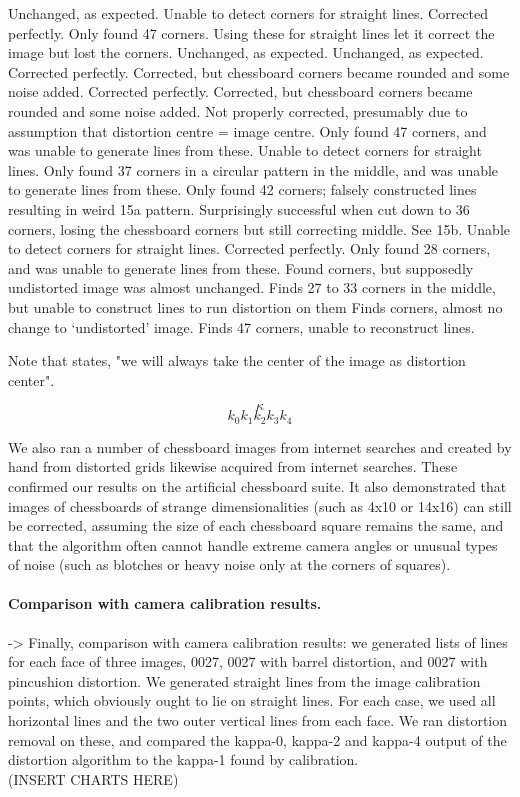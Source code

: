 Unchanged, as expected.
Unable to detect corners for straight lines.
Corrected perfectly.
Only found 47 corners. Using these for straight lines let it correct the image but lost the corners.
Unchanged, as expected.
Unchanged, as expected.
Corrected perfectly.
Corrected, but chessboard corners became rounded and some noise added.
Corrected perfectly.
Corrected, but chessboard corners became rounded and some noise added.
Not properly corrected, presumably due to assumption that distortion centre = image centre.
Only found 47 corners, and was unable to generate lines from these.
Unable to detect corners for straight lines.
Only found 37 corners in a circular pattern in the middle, and was unable to generate lines from these.
Only found 42 corners; falsely constructed lines resulting in weird 15a pattern. Surprisingly successful when cut down to 36 corners, losing the chessboard corners but still correcting middle. See 15b.
Unable to detect corners for straight lines.
Corrected perfectly.
Only found 28 corners, and was unable to generate lines from these.
Found corners, but supposedly undistorted image was almost unchanged.
Finds 27 to 33 corners in the middle, but unable to construct lines to run distortion on them
Finds corners, almost no change to ‘undistorted’ image.
Finds 47 corners, unable to reconstruct lines.



Note that \cite{algebraic-distortion} states, "we will always take the center of the image as distortion center".

\[
  \kappa
\]
\[
 k_{0}
 k_{1}
 k_{2}
 k_{3}
 k_{4}
\]


We also ran a number of chessboard images from internet searches and created by hand from distorted grids likewise acquired from internet searches. These confirmed our results on the artificial chessboard suite. It also demonstrated that images of chessboards of strange dimensionalities (such as 4x10 or 14x16) can still be corrected, assuming the size of each chessboard square remains the same, and that the algorithm often cannot handle extreme camera angles or unusual types of noise (such as blotches or heavy noise only at the corners of squares).

\paragraph{Comparison with camera calibration results.}

-> Finally, comparison with camera calibration results: we generated lists of lines for each face of three images, 0027, 0027 with barrel distortion, and 0027 with pincushion distortion. We generated straight lines from the image calibration points, which obviously ought to lie on straight lines. For each case, we used all horizontal lines and the two outer vertical lines from each face. We ran distortion removal on these, and compared the kappa-0, kappa-2 and kappa-4 output of the distortion algorithm to the kappa-1 found by calibration.\\

(INSERT CHARTS HERE)





